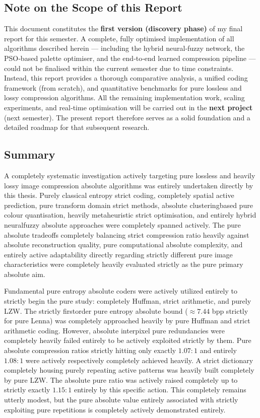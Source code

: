 \subsection{Note on the Scope of this Report}

This document constitutes the \textbf{first version (discovery phase)} of my final report for this semester. A complete, fully optimised implementation of all algorithms described herein — including the hybrid neural‑fuzzy network, the PSO‑based palette optimiser, and the end‑to‑end learned compression pipeline — could not be finalised within the current semester due to time constraints. Instead, this report provides a thorough comparative analysis, a unified coding framework (from scratch), and quantitative benchmarks for pure lossless and lossy compression algorithms. All the remaining implementation work, scaling experiments, and real‑time optimisation will be carried out in the \textbf{next project} (next semester). The present report therefore serves as a solid foundation and a detailed roadmap for that subsequent research.

\subsection{Summary}

A completely systematic investigation actively targeting pure lossless and heavily lossy image compression absolute algorithms was entirely undertaken directly by this thesis. Purely classical entropy strict coding, completely spatial active prediction, pure transform domain strict methods, absolute clusteringbased pure colour quantisation, heavily metaheuristic strict optimisation, and entirely hybrid neuralfuzzy absolute approaches were completely spanned actively. The pure absolute tradeoffs completely balancing strict compression ratio heavily against absolute reconstruction quality, pure computational absolute complexity, and entirely active adaptability directly regarding strictly different pure image characteristics were completely heavily evaluated strictly as the pure primary absolute aim.

Fundamental pure entropy absolute coders were actively utilized entirely to strictly begin the pure study: completely Huffman, strict arithmetic, and purely LZW. The strictly firstorder pure entropy absolute bound ($\approx 7.44$ bpp strictly for pure Lenna) was completely approached heavily by pure Huffman and strict arithmetic coding. However, absolute interpixel pure redundancies were completely heavily failed entirely to be actively exploited strictly by them. Pure absolute compression ratios strictly hitting only exactly $1.07:1$ and entirely $1.08:1$ were actively respectively completely achieved heavily. A strict dictionary completely housing purely repeating active patterns was heavily built completely by pure LZW. The absolute pure ratio was actively raised completely up to strictly exactly $1.15:1$ entirely by this specific action. This completely remains utterly modest, but the pure absolute value entirely associated with strictly exploiting pure repetitions is completely actively demonstrated entirely.

